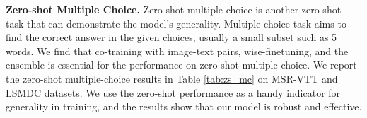 \textbf{Zero-shot Multiple Choice.}
Zero-shot multiple choice is another zero-shot task that can demonstrate the model's generality. Multiple choice task aims to find the correct answer in the given choices, usually a small subset such as 5 words. We find that co-training with image-text pairs, wise-finetuning, and the ensemble is essential for the performance on zero-shot multiple choice. We report the zero-shot multiple-choice results in Table \ref{tab:zs_mc} on MSR-VTT and LSMDC datasets. We use the zero-shot performance as a handy indicator for generality in training, and the results show that our model is robust and effective.


